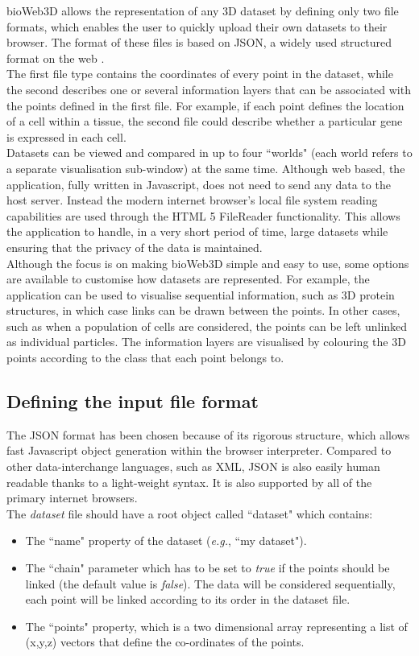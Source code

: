 \documentclass{bioinfo}
\begin{document}
bioWeb3D allows the representation of any 3D dataset by defining only two file formats, which enables the user to quickly upload their own datasets to their browser. The format of these files is based on JSON, a widely used structured format on the web \citep{Wilde07}.\\
The first file type contains the coordinates of every point in the dataset, while the second describes one or several information layers that can be associated with the points defined in the first file. For example, if each point defines the location of a cell within a tissue, the second file could describe whether a particular gene is expressed in each cell. \\
Datasets can be viewed and compared in up to four ``worlds" (each world refers to a separate visualisation sub-window) at the same time. Although web based, the application, fully written in Javascript, does not need to send any data to the host server. Instead the modern internet browser's local file system reading capabilities are used through the HTML 5 FileReader functionality. This allows the application to handle, in a very short period of time, large datasets while ensuring that the privacy of the data is maintained.\\
Although the focus is on making bioWeb3D simple and easy to use, some options are available to customise how datasets are represented. For example, the application can be used to visualise sequential information, such as 3D protein structures, in which case links can be drawn between the points. In other cases, such as when a population of cells are considered, the points can be left unlinked as individual particles. The information layers are visualised by colouring the 3D points according to the class that each point belongs to.
\subsection{Defining the input file format}
The JSON format has been chosen because of its rigorous structure, which allows fast Javascript object generation within the browser interpreter. Compared to other data-interchange languages, such as XML, JSON is also easily human readable thanks to a light-weight syntax. It is also supported by all of the primary internet browsers.\\
The {\it{dataset}} file should have a root object called ``dataset" which contains: 
\begin{itemize}
\item{The ``name" property of the dataset (\textit{e.g.}, ``my dataset").}
\item{The ``chain" parameter which has to be set to \textit{true} if the points should be linked (the default value is \textit{false}). The data will be considered sequentially, each point will be linked according to its order in the dataset file.}
\item{The ``points" property, which is a two dimensional array representing a list of (x,y,z) vectors that define the co-ordinates of the points.}
\end{itemize}
\end{document}
